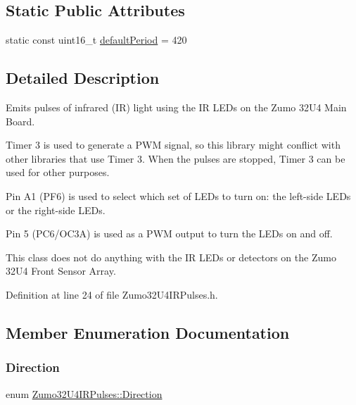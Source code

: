 \subsection*{Static Public Attributes}
\begin{DoxyCompactItemize}
\item 
static const uint16\+\_\+t \hyperlink{class_zumo32_u4_i_r_pulses_ae72ab04d5b682b3170a1542344cb3f75}{default\+Period} = 420
\end{DoxyCompactItemize}


\subsection{Detailed Description}
Emits pulses of infrared (IR) light using the IR L\+E\+Ds on the Zumo 32\+U4 Main Board. 

Timer 3 is used to generate a P\+WM signal, so this library might conflict with other libraries that use Timer 3. When the pulses are stopped, Timer 3 can be used for other purposes.

Pin A1 (P\+F6) is used to select which set of L\+E\+Ds to turn on\+: the left-\/side L\+E\+Ds or the right-\/side L\+E\+Ds.

Pin 5 (P\+C6/\+O\+C3A) is used as a P\+WM output to turn the L\+E\+Ds on and off.

This class does not do anything with the IR L\+E\+Ds or detectors on the Zumo 32\+U4 Front Sensor Array. 

Definition at line 24 of file Zumo32\+U4\+I\+R\+Pulses.\+h.



\subsection{Member Enumeration Documentation}
\mbox{\label{class_zumo32_u4_i_r_pulses_a5252acaa381240e6b8ca499eaf304616}} 
\subsubsection{\texorpdfstring{Direction}{Direction}}
{\footnotesize\ttfamily enum \hyperlink{class_zumo32_u4_i_r_pulses_a5252acaa381240e6b8ca499eaf304616}{Zumo32\+U4\+I\+R\+Pulses\+::\+Direction}}


